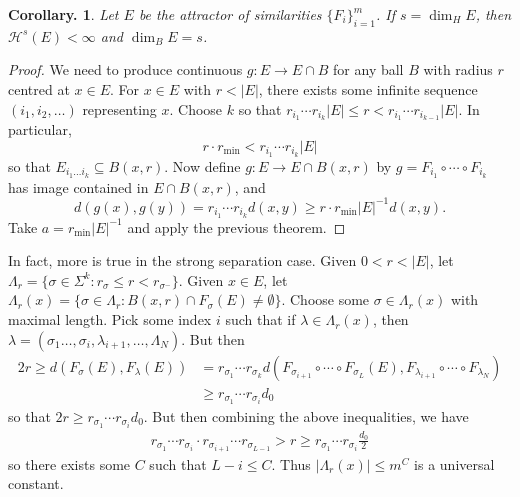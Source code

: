 \documentclass[11pt, a4paper]{memoir}
\theoremstyle{change}
\newtheorem{corollary}[theorem]{Corollary.}
\theoremstyle{plain}
\theoremstyle{nonumberplain}
\newtheorem{proof}{Proof}
\numberwithin{equation}{section}
\begin{document}
\begin{corollary}
    Let $E$ be the attractor of similarities $\{F_i\}_{i=1}^m$. %
    If $s=\dim_H E$, then $\mathcal{H}^s(E)<\infty$ and $\dim_B E=s$.
\end{corollary}
\begin{proof}
    We need to produce continuous $g:E\to E\cap B$ for any ball $B$ with radius $r$ centred at $x\in E$.
    For $x\in E$ with $r<|E|$, there exists some infinite sequence $(i_1,i_2,\ldots)$ representing $x$.
    Choose $k$ so that $r_{i_1}\cdots r_{i_k}|E|\leq r<r_{i_1}\cdots r_{i_{k-1}}|E|$.
    In particular,
    \begin{equation*}
        r\cdot r_{\min}<r_{i_1}\cdots r_{i_k}|E|
    \end{equation*}
    so that $E_{i_1\ldots i_k}\subseteq B(x,r)$.
    Now define $g:E\to E\cap B(x,r)$ by $g=F_{i_1}\circ\cdots\circ F_{i_k}$ has image contained in $E\cap B(x,r)$, and
    \begin{equation*}
        d(g(x),g(y))=r_{i_1}\cdots r_{i_k}d(x,y)\geq r\cdot r_{\min}|E|^{-1}d(x,y).
    \end{equation*}
    Take $a=r_{\min}|E|^{-1}$ and apply the previous theorem.
\end{proof}
In fact, more is true in the strong separation case.
Given $0<r<|E|$, let $\Lambda_r=\{\sigma\in\Sigma^k:r_\sigma\leq r<r_{\sigma^-}\}$.
Given $x\in E$, let $\Lambda_r(x)=\{\sigma\in\Lambda_r:B(x,r)\cap F_\sigma(E)\neq\emptyset\}$.
Choose some $\sigma\in\Lambda_r(x)$ with maximal length.
Pick some index $i$ such that if $\lambda\in\Lambda_r(x)$, then $\lambda=(\sigma_1\ldots,\sigma_i,\lambda_{i+1},\ldots,\Lambda_N)$.
But then
\begin{align*}
    2r\geq d(F_\sigma(E),F_\lambda(E)) &= r_{\sigma_1}\cdots r_{\sigma_k}d(F_{\sigma_{i+1}}\circ\cdots\circ F_{\sigma_L}(E),F_{\lambda_{i+1}}\circ\cdots\circ F_{\lambda_N})\\
                                       &\geq r_{\sigma_1}\cdots r_{\sigma_i}d_0
\end{align*}
so that $2r\geq r_{\sigma_1}\cdots r_{\sigma_i}d_0$.
But then combining the above inequalities, we have
\begin{align*}
    r_{\sigma_1}\cdots r_{\sigma_i}\cdot r_{\sigma_{i+1}}\cdots r_{\sigma_{L-1}} >r\geq r_{\sigma_1}\cdots r_{\sigma_i}\frac{d_0}{2}
\end{align*}
so there exists some $C$ such that $L-i\leq C$.
Thus $|\Lambda_r(x)|\leq m^C$ is a universal constant.
\end{document}
